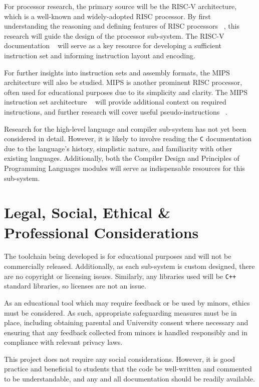 \documentclass{article}
\begin{document}
    For processor research, the primary source will be the RISC-V architecture, which is a well-known and widely-adopted RISC processor.
    By first understanding the reasoning and defining features of RISC processors ~\cite{risc-vs-cisc}, this research will guide the design of the processor sub-system.
    The RISC-V documentation ~\cite{riscv-docs} will serve as a key resource for developing a sufficient instruction set and informing instruction layout and encoding.

    For further insights into instruction sets and assembly formats, the MIPS architecture will also be studied.
    MIPS is another prominent RISC processor, often used for educational purposes due to its simplicity and clarity.
    The MIPS instruction set architecture ~\cite{mips-isa} will provide additional context on required instructions, and further research will cover useful pseudo-instructions ~\cite{mips-pseudo-instructions}.

    Research for the high-level language and compiler sub-system has not yet been considered in detail.
    However, it is likely to involve reading the \texttt{C} documentation due to the language's history, simplistic nature, and familiarity with other existing languages.
    Additionally, both the Compiler Design and Principles of Programming Languages modules will serve as indispensable resources for this sub-system.

    \section{Legal, Social, Ethical \& Professional Considerations}\label{sec:considerations}


    The toolchain being developed is for educational purposes and will not be commercially released.
    Additionally, as each sub-system is custom designed, there are no copyright or licensing issues.
    Similarly, any libraries used will be \texttt{C++} standard libraries, so licenses are not an issue.

    As an educational tool which may require feedback or be used by minors, ethics must be considered.
    As such, appropriate safeguarding measures must be in place, including obtaining parental and University consent where necessary and ensuring that any feedback collected from minors is handled responsibly and in compliance with relevant privacy laws.

    This project does not require any social considerations.
    However, it is good practice and beneficial to students that the code be well-written and commented to be understandable, and any and all documentation should be readily available.

    \printbibliography
\end{document}
